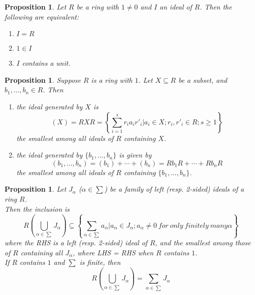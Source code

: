 \documentclass[a4paper,8pt]{article}
\theoremstyle{theorem}
\newtheorem{proposition}[theorem]{Proposition}
\begin{document}
\begin{proposition}
Let $R$ be a ring with $1 \neq 0$ and $I$ an ideal of $R$. Then the following are equivalent:
\begin{enumerate}[label=(\roman*)]
\item $I = R$
\item $1 \in I$
\item $I$ contains a unit.	
\end{enumerate}
\end{proposition}


\begin{proposition}
Suppose $R$ is a ring with $1$. Let $X \subseteq R$ be a subset, and $b_1, \ldots, b_n \in R$. Then
\begin{enumerate}[label=(\roman*)]
\item the ideal generated by $X$ is
\begin{equation}
(X)=RXR=\left\{ \sum_{i=1}^{s} r_i a_i r'_i | a_i \in X; r_i, r'_i \in R; s \geq 1\right\} \nonumber
\end{equation} 
the smallest among all ideals of $R$ containing $X$.
\item the ideal generated by $\{b_1, \ldots, b_n\}$ is given by 
\begin{equation}
(b_1, \ldots, b_n) = (b_1) + \cdots + (b_n) = Rb_1R + \cdots + Rb_nR \nonumber
\end{equation}
the smallest among all ideals of $R$ containing $\{b_1, \ldots, b_n\}$.
\end{enumerate}
\end{proposition}


\begin{proposition}
Let $J_\alpha$ ($\alpha \in \sum$) be a family of left (resp. 2-sided) ideals of a ring $R$.\\
Then the inclusion is
\begin{equation}
R(\bigcup\limits_{\alpha \in \sum}J_{\alpha}) \subseteq \left\{\sum_{\alpha \in \sum} a_{\alpha} | a_{\alpha} \in J_\alpha; a_{\alpha} \neq 0 \ for \ only \ finitely \ many \alpha \right\} \nonumber
\end{equation}
where the RHS is a left (resp. 2-sided) ideal of $R$, and the smallest among those of $R$ containing all $J_\alpha$, where LHS = RHS when $R$ contains $1$.\\
If $R$ contains $1$ and $\sum$ is finite, then
\begin{equation}
R(\bigcup\limits_{\alpha \in \sum}J_{\alpha}) = \sum_{\alpha \in \sum} J_{\alpha} \nonumber
\end{equation}
\end{proposition}
\end{document}
